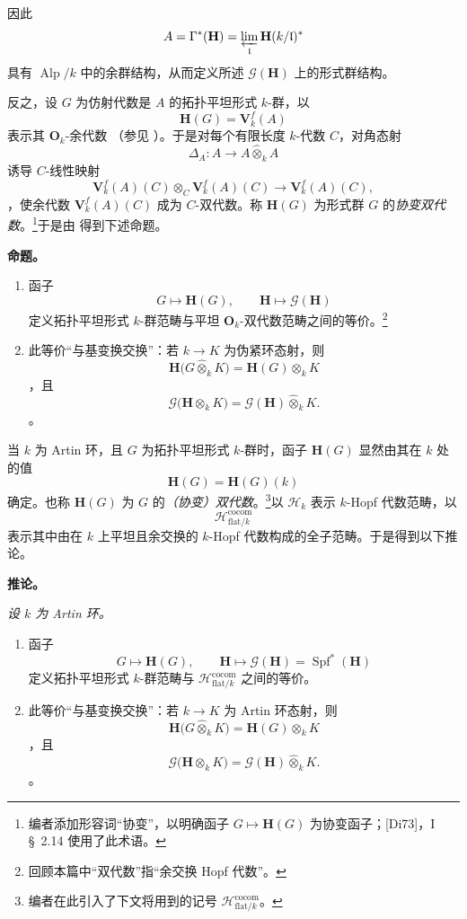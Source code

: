 因此 \[
  A
  =
  \Gamma^*(\mathbf H)
  =
  \varprojlim_{\mathfrak l}\mathbf H(k/\mathfrak l)^*
\] 具有 \(\operatorname{Alp}/k\) 中的余群结构，从而定义所述 \(\mathscr G(\mathbf H)\) 上的形式群结构。

反之，设 \(G\) 为仿射代数是 \(A\) 的拓扑平坦形式 \(k\)-群，以 \[
  \mathbf H(G)=\mathbf V_k^f(A)
\] 表示其 \(\mathbf O_k\)-余代数 \textup{（参见 ）}。于是对每个有限长度 \(k\)-代数 \(C\)，对角态射 \[
  \Delta_A:A\longrightarrow A\widehat\otimes_kA
\] 诱导 \(C\)-线性映射 \[
  \mathbf V_k^f(A)(C)
  \otimes_C
  \mathbf V_k^f(A)(C)
  \longrightarrow
  \mathbf V_k^f(A)(C),
\]，使余代数 \(\mathbf V_k^f(A)(C)\) 成为 \(C\)-双代数。称 \(\mathbf H(G)\) 为形式群 \(G\) 的\emph{协变双代数}。\footnote{\label{sga3:VIIB:nde:80}编者添加形容词“协变”，以明确函子 \(G\mapsto\mathbf H(G)\) 为协变函子；[Di73]，I \S~2.14 使用了此术语。}于是由  得到下述命题。

\medskip\noindent\textbf{命题。} \label{sga3:VIIB:2.2.1.prop}{\itshape\begin{enumerate}\item[\textup{(i)}]函子 \[
  G\longmapsto\mathbf H(G),
  \qquad
  \mathbf H\longmapsto\mathscr G(\mathbf H)
\] 定义拓扑平坦形式 \(k\)-群范畴与平坦 \(\mathbf O_k\)-双代数范畴之间的等价。\footnote{\label{sga3:VIIB:nde:81}回顾本篇中“双代数”指“余交换 Hopf 代数”。}

\item[\textup{(ii)}]此等价“与基变换交换”：若 \(k\to K\) 为伪紧环态射，则 \[
  \mathbf H\bigl(G\widehat\otimes_kK\bigr)
  =
  \mathbf H(G)\otimes_kK
\]，且 \[
  \mathscr G\bigl(\mathbf H\otimes_kK\bigr)
  =
  \mathscr G(\mathbf H)\widehat\otimes_kK.
\]。\end{enumerate}}

当 \(k\) 为 Artin 环，且 \(G\) 为拓扑平坦形式 \(k\)-群时，函子 \(\mathbf H(G)\) 显然由其在 \(k\) 处的值 \[
  \mathbf H(G)=\mathbf H(G)(k)
\] 确定。也称 \(\mathbf H(G)\) 为 \(G\) 的\emph{（协变）双代数}。\footnote{\label{sga3:VIIB:nde:82}编者在此引入了下文将用到的记号 \(\mathcal H^{\mathrm{cocom}}_{\mathrm{flat}/k}\)。}以 \(\mathcal H_k\) 表示 \(k\)-Hopf 代数范畴，以 \[
  \mathcal H^{\mathrm{cocom}}_{\mathrm{flat}/k}
\] 表示其中由在 \(k\) 上平坦且余交换的 \(k\)-Hopf 代数构成的全子范畴。于是得到以下推论。

\medskip\noindent\textbf{推论。} \label{sga3:VIIB:2.2.1.cor}{\itshape 设 \(k\) 为 Artin 环。\begin{enumerate}\item[\textup{(i)}]函子 \[
  G\longmapsto\mathbf H(G),
  \qquad
  \mathbf H\longmapsto
  \mathscr G(\mathbf H)=\operatorname{Spf}^*(\mathbf H)
\] 定义拓扑平坦形式 \(k\)-群范畴与 \(\mathcal H^{\mathrm{cocom}}_{\mathrm{flat}/k}\) 之间的等价。

\item[\textup{(ii)}]此等价“与基变换交换”：若 \(k\to K\) 为 Artin 环态射，则 \[
  \mathbf H\bigl(G\widehat\otimes_kK\bigr)
  =
  \mathbf H(G)\otimes_kK
\]，且 \[
  \mathscr G\bigl(\mathbf H\otimes_kK\bigr)
  =
  \mathscr G(\mathbf H)\widehat\otimes_kK.
\]。\end{enumerate}}

